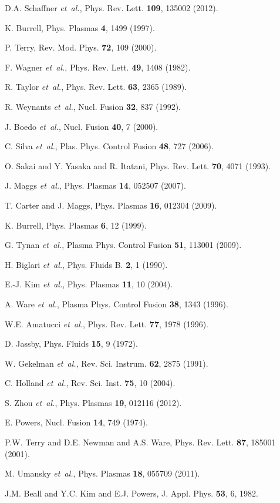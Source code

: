 \documentclass[aip,pop,amsmath,amssymb,reprint,superscriptaddress]{revtex4-1} %
\begin{document}
\providecommand{\noopsort}[1]{}\providecommand{\singleletter}[1]{#1}%
\begin{thebibliography}{10}

D.A. Schaffner {\it et~al.}, Phys. Rev. Lett. {\bf 109}, 135002 (2012).

K. Burrell, Phys. Plasmas {\bf 4},  1499  (1997).

P. Terry, Rev. Mod. Phys. {\bf 72},  109  (2000).

F. Wagner {\it et~al.}, Phys. Rev. Lett. {\bf 49},  1408  (1982).

R. Taylor {\it et~al.}, Phys. Rev. Lett. {\bf 63},  2365  (1989).

R. Weynants {\it et~al.}, Nucl. Fusion {\bf 32},  837  (1992).

J. Boedo {\it et~al.}, Nucl. Fusion {\bf 40},  7  (2000).

C. Silva {\it et~al.}, Plas. Phys. Control Fusion {\bf 48},  727  (2006).

O. Sakai and Y. Yasaka and R. Itatani, Phys. Rev. Lett. {\bf 70},  4071 (1993).

J. Maggs {\it et~al.}, Phys. Plasmas {\bf 14},  052507  (2007).

T. Carter and J. Maggs, Phys. Plasmas {\bf 16},  012304  (2009).

K. Burrell, Phys. Plasmas {\bf 6},  12  (1999).

G. Tynan {\it et~al.}, Plasma Phys. Control Fusion {\bf 51}, 113001  (2009).

H. Biglari {\it et~al.}, Phys. Fluids B. {\bf 2},  1  (1990).

E.-J. Kim {\it et~al.}, Phys. Plasmas {\bf 11},  10  (2004).

A. Ware {\it et~al.}, Plasma Phys. Control Fusion
  {\bf 38},  1343  (1996).

W.E. Amatucci {\it et~al.}, Phys. Rev. Lett. {\bf 77},  1978  (1996).

D. Jassby, Phys. Fluids {\bf 15},  9  (1972).

W. Gekelman {\it et~al.}, Rev. Sci. Instrum. {\bf 62},  2875  (1991).

C. Holland {\it et~al.}, Rev. Sci. Inst. {\bf 75},  10
  (2004).

S. Zhou {\it et~al.}, Phys. Plasmas {\bf 19},  012116  (2012).

E. Powers, Nucl. Fusion {\bf 14},  749  (1974).

P.W. Terry and D.E. Newman and A.S. Ware, Phys. Rev. Lett. {\bf 87}, 185001  (2001).

M. Umansky {\it et~al.}, Phys. Plasmas {\bf 18},  055709  (2011).

J.M. Beall and Y.C. Kim and E.J. Powers, J. Appl. Phys. {\bf 53}, 6, {1982}.

\end{thebibliography}
\end{document}
